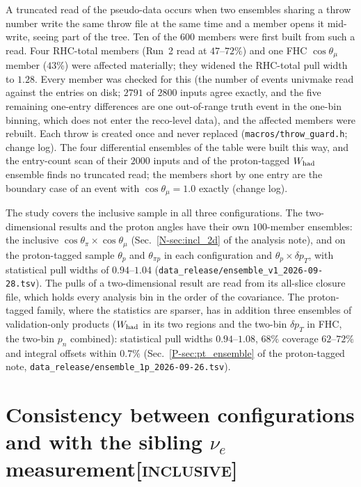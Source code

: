 \documentclass[11pt,a4paper]{article}
\newcommand{\ptref}[2]{#1~\ref{P-#2} of the proton-tagged note}
\newcommand{\noteref}[2]{#1~\ref{N-#2} of the analysis note}
\newcommand{\scopetag}[1]{\hfill{\normalfont\small\textsc{[#1]}}}
\begin{document}
A truncated read of the pseudo-data occurs when two ensembles sharing a throw number write the
same throw file at the same time and a member opens it mid-write, seeing part of the tree. Ten of the $600$ members were first built from such a
read. Four RHC-total members (Run~2 read at $47$--$72\%$) and one FHC
$\cos\theta_\mu$ member ($43\%$) were affected materially; they widened the RHC-total pull width
to $1.28$. Every member was checked for this (the number of events univmake read against the entries on disk;
$2791$ of $2800$ inputs agree exactly, and the five remaining one-entry differences are one
out-of-range truth event in the one-bin binning, which does not enter the reco-level data), and
the affected members were rebuilt. Each throw is created once and never replaced
(\texttt{macros/throw\_guard.h}; change log). The four differential ensembles of the table were built
this way, and the entry-count scan of their $2000$ inputs and of the proton-tagged $W_{\rm had}$
ensemble finds no truncated read; the members short by one entry are the boundary case of an
event with $\cos\theta_\mu=1.0$ exactly (change log).

The study covers the inclusive sample in all three configurations. The two-dimensional results and
the proton angles have their own $100$-member ensembles: the inclusive
$\cos\theta_\pi\times\cos\theta_\mu$ (\noteref{Sec.}{sec:incl_2d}), and on the proton-tagged sample
$\theta_p$ and $\theta_{\pi p}$ in each configuration and $\theta_p\times\delta p_T$, with statistical
pull widths of $0.94$--$1.04$ (\texttt{data\_release/ensemble\_v1\_2026-09-28.tsv}). The pulls of a
two-dimensional result are read from its all-slice closure file, which holds every analysis bin in the
order of the covariance. The proton-tagged family, where the statistics are sparser, has in addition
three ensembles of validation-only products ($W_{\rm had}$ in its two regions and the two-bin
$\delta p_T$ in FHC, the two-bin $p_n$ combined): statistical pull widths $0.94$--$1.08$, $68\%$
coverage $62$--$72\%$ and integral offsets within $0.7\%$ (\ptref{Sec.}{sec:pt_ensemble},
\texttt{data\_release/ensemble\_1p\_2026-09-26.tsv}).




\section[Consistency between configurations and with the sibling $\nu_e$ measurement]{Consistency between configurations and with the sibling $\nu_e$ measurement\scopetag{inclusive}}
\label{sec:supp_closure}
\end{document}
